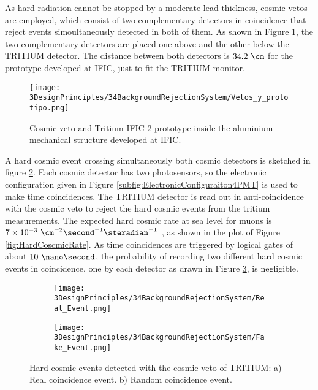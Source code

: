 As hard radiation cannot be stopped by a moderate lead thickness, cosmic vetos are employed, which consist of two complementary detectors in coincidence that reject events simoultaneously detected in both of them. As shown in Figure \ref{fig:VetoAndPrototype}, the two complementary detectors are placed one above and the other below the TRITIUM detector. The distance between both detectors is $34.2~\cm$ for the prototype developed at IFIC, just to fit the TRITIUM monitor.

\begin{figure}[h]
\centering
\texttt{[image: 3DesignPrinciples/34BackgroundRejectionSystem/Vetos\_y\_prototipo.png]}
\caption{Cosmic veto and Tritium-IFIC-2 prototype inside the aluminium mechanical structure developed at IFIC.\label{fig:VetoAndPrototype}}
\end{figure}

A hard cosmic event crossing simultaneously both cosmic detectors is sketched in figure \ref{subfig:RealHardCosmicEvent}. Each cosmic detector has two photosensors, so the electronic configuration given in Figure \ref{subfig:ElectronicConfiguraiton4PMT} is used to make time coincidences. The TRITIUM detector is read out in anti-coincidence with the cosmic veto to reject the hard cosmic events from the tritium measurements. The expected hard cosmic rate at sea level for muons is $7\times 10^{-3}~\cm^{-2}\second^{-1}\steradian^{-1}$ \cite{PDG, HardCosmicMuonRate}, as shown in the plot of Figure \ref{fig:HardCoscmicRate}. As time coincidences are triggered by logical gates of about $10~\nano\second$, the probability of recording two different hard cosmic events in coincidence, one by each detector as drawn in Figure \ref{subfig:FakeHardCosmicEvent}, is negligible.

\begin{figure}[h]
\centering
    \begin{subfigure}[b]{0.45\textwidth}
    \centering
    \texttt{[image: 3DesignPrinciples/34BackgroundRejectionSystem/Real\_Event.png]}  
    \caption{\label{subfig:RealHardCosmicEvent}}
    \end{subfigure}
    \hfill
    \begin{subfigure}[b]{0.45\textwidth}
    \centering
    \texttt{[image: 3DesignPrinciples/34BackgroundRejectionSystem/Fake\_Event.png]}  
    \caption{\label{subfig:FakeHardCosmicEvent}}
    \end{subfigure}
   \caption{Hard cosmic events detected with the cosmic veto of TRITIUM: a) Real coincidence event. b) Random coincidence event.}
 \label{fig:HardCosmicEventsSimulation}
\end{figure}

